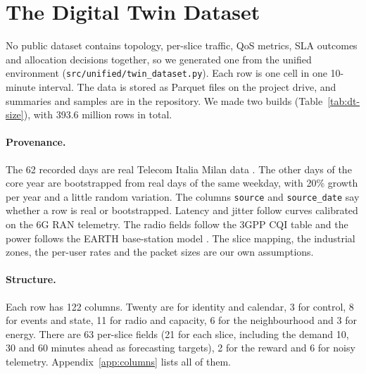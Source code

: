 \section{The Digital Twin Dataset}
\label{sec:dt-dataset}
No public dataset contains topology, per-slice traffic, QoS metrics, SLA outcomes and allocation decisions together, so we generated one from the unified environment (\texttt{src/\allowbreak unified/\allowbreak twin\_\allowbreak dataset.py}). Each row is one cell in one 10-minute interval. The data is stored as Parquet files on the project drive, and summaries and samples are in the repository. We made two builds (Table~\ref{tab:dt-size}), with 393.6 million rows in total.

\begin{table}[htbp]
	\centering
	\caption{Size of the Digital Twin dataset}
	\label{tab:dt-size}
	\small
\end{table}

\paragraph{Provenance.}
The 62 recorded days are real Telecom Italia Milan data \cite{barlacchi2015}. The other days of the core year are bootstrapped from real days of the same weekday, with 20\% growth per year and a little random variation. The columns \texttt{source} and \texttt{source\_date} say whether a row is real or bootstrapped. Latency and jitter follow curves calibrated on the 6G RAN telemetry. The radio fields follow the 3GPP CQI table \cite{3gpp38214} and the power follows the EARTH base-station model \cite{auer2011}. The slice mapping, the industrial zones, the per-user rates and the packet sizes are our own assumptions.

\paragraph{Structure.}
Each row has 122 columns. Twenty are for identity and calendar, 3 for control, 8 for events and state, 11 for radio and capacity, 6 for the neighbourhood and 3 for energy. There are 63 per-slice fields (21 for each slice, including the demand 10, 30 and 60 minutes ahead as forecasting targets), 2 for the reward and 6 for noisy telemetry. Appendix~\ref{app:columns} lists all of them.

